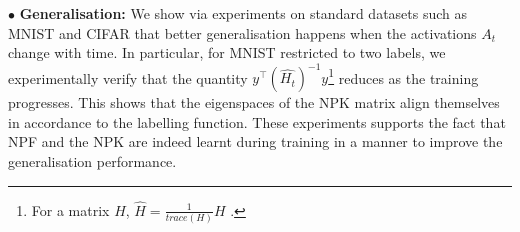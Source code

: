 \documentclass{article}
\begin{document}
$\bullet$ \textbf{Generalisation:} We show via experiments on standard datasets such as MNIST and CIFAR that better generalisation happens when the activations $A_t$ change with time. In particular, for MNIST restricted to two labels, we experimentally verify that the quantity $y^\top (\widehat{H_t})^{-1}y$\footnote{For a matrix $H$, $\hat{H}=\frac{1}{trace(H)}H$ .} reduces as the training progresses. This shows that the eigenspaces of the NPK matrix align themselves in accordance to the labelling function. These experiments supports the fact that NPF and the NPK are indeed learnt during training in a manner to improve the generalisation performance. 



\begin{comment}
\textbf{Path-View:} Central to the contributions in the paper is the concept of \emph{path-view}, wherein, paths are regarded as basic building blocks of DNNs. A \emph{path} starts from an input node $i\in[d_{in}]$, passes through exactly one weight and one activation in each layer, and finally ends at the output node. Using shorthand notation, say a path $p$ pass through input node $\I_0(p)\in [d_{in}]$, and weights $\Theta(l,\I_{l-1}(p),\I_l(p)),l\in[d-1]$, and gates $G(l,I_l(p))$

For an FC-DNN with $d$ layers (depth), and $w$ hidden units per-layer, the total number of paths (denoted by $P$) starting from a given input node $i\in[d_{in}]$ is $w^{(d-1)}$.

$\bullet$ At time $t$, for an input $x\in \R^{d_{in}}$, a path $p$ is associated with two quantities namely: (i) the path value denoted by $v_t(p)$, which is the product of the weights in the path, and (ii) the path activation level denoted by $A_t(x,p)$ which is the product of the gates\footnote{In the case of DNN with ReLU activations/gates, $A_t(x,p) \in \{0,1\}$.} in the path. Note that the activation level of a path is dependent on the input and the value of a path is not dependent on the input.
\end{comment}
\end{document}
